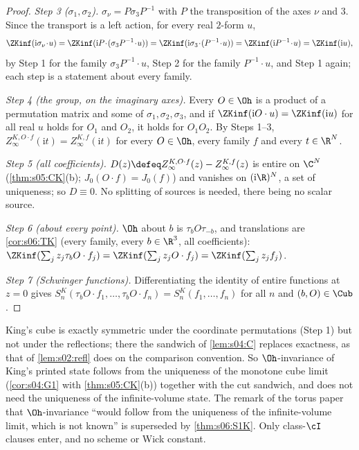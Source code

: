 \begin{proof}
\emph{Step 3 ($\sigma_1,\sigma_2$).} $\sigma_\nu=P\sigma_3P^{-1}$ with $P$ the transposition of the axes $\nu$ and $3$. Since the transport is a left action, for every real $2$-form $u$,
\[
\ZKinf(\mathrm i\sigma_\nu\!\cdot\!u)=\ZKinf(\mathrm iP\!\cdot\!(\sigma_3P^{-1}\!\cdot\!u))=\ZKinf(\mathrm i\sigma_3\!\cdot\!(P^{-1}\!\cdot\!u))=\ZKinf(\mathrm iP^{-1}\!\cdot\!u)=\ZKinf(\mathrm iu),
\]
by Step 1 for the family $\sigma_3P^{-1}\cdot u$, Step 2 for the family $P^{-1}\cdot u$, and Step 1 again; each step is a statement about every family.

\emph{Step 4 (the group, on the imaginary axes).} Every $O\in\Oh$ is a product of a permutation matrix and some of $\sigma_1,\sigma_2,\sigma_3$, and if $\ZKinf(\mathrm iO\cdot u)=\ZKinf(\mathrm iu)$ for all real $u$ holds for $O_1$ and $O_2$, it holds for $O_1O_2$. By Steps 1--3, $Z^{K,O\cdot f}_\infty(\mathrm it)=Z^{K,f}_\infty(\mathrm it)$ for every $O\in\Oh$, every family $f$ and every $t\in\R^N$.

\emph{Step 5 (all coefficients).} $D(z)\defeq Z^{K,O\cdot f}_\infty(z)-Z^{K,f}_\infty(z)$ is entire on $\C^N$ (\cref{thm:s05:CK}(b); $J_0(O\cdot f)=J_0(f)$) and vanishes on $(\mathrm i\R)^N$, a set of uniqueness; so $D\equiv0$. No splitting of sources is needed, there being no scalar source.

\emph{Step 6 (about every point).} $\Oh$ about $b$ is $\tau_bO\tau_{-b}$, and translations are \cref{cor:s06:TK} (every family, every $b\in\R^3$, all coefficients): $\ZKinf(\sum_jz_j\tau_bO\cdot f_j)=\ZKinf(\sum_jz_jO\cdot f_j)=\ZKinf(\sum_jz_jf_j)$.

\emph{Step 7 (Schwinger functions).} Differentiating the identity of entire functions at $z=0$ gives $S^K_n(\tau_bO\cdot f_1,\dots,\tau_bO\cdot f_n)=S^K_n(f_1,\dots,f_n)$ for all $n$ and $(b,O)\in\Cub$.
\end{proof}

\begin{remark}\label{rem:s06:K4}
King's cube is exactly symmetric under the coordinate permutations (Step 1) but not under the reflections; there the sandwich of \cref{lem:s04:C} replaces exactness, as that of \cref{lem:s02:refl} does on the comparison convention. So $\Oh$-invariance of King's printed state follows from the uniqueness of the monotone cube limit (\cref{cor:s04:G1} with \cref{thm:s05:CK}(b)) together with the cut sandwich, and does not need the uniqueness of the infinite-volume state. The remark of the torus paper \cite{SymPhase} that $\Oh$-invariance ``would follow from the uniqueness of the infinite-volume limit, which is not known'' is superseded by \cref{thm:s06:S1K}. Only class-$\cI$ clauses enter, and no scheme or Wick constant.
\end{remark}

